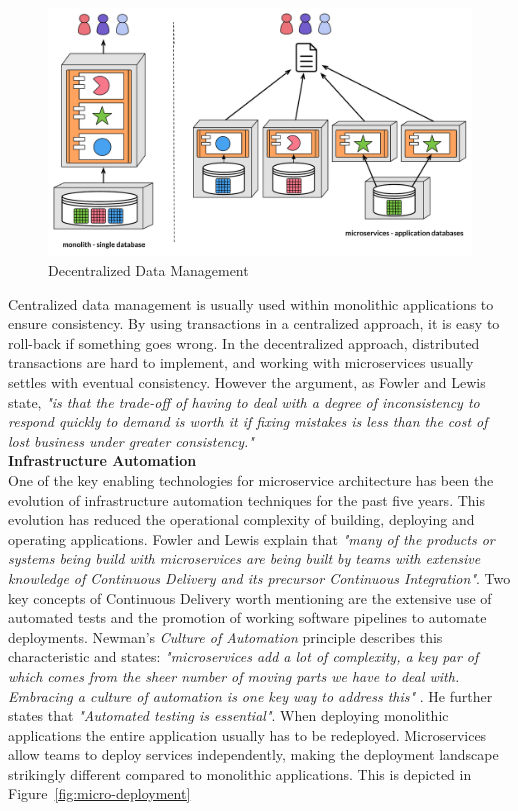 \begin{figure}[H]
    \centering
    \includegraphics[width=\textwidth]{figures/microservice_decentralised-data}
    \caption{Decentralized Data Management \cite[p. 10]{lewis2014microservices}}
    \label{fig:micro_decentralized_datamanagement}
\end{figure}

\noindent Centralized data management is usually used within monolithic applications to ensure consistency. By using transactions in a centralized approach, it is easy to roll-back if something goes wrong. In the decentralized approach, distributed transactions are hard to implement, and working with microservices usually settles with eventual consistency. However the argument, as Fowler and Lewis state, \textit{"is that the trade-off of having to deal with a degree of inconsistency to respond quickly to demand is worth it if fixing mistakes is less than the cost of lost business under greater consistency."} \cite[p. 10]{lewis2014microservices} \\


\noindent\textbf{Infrastructure Automation} \\
One of the key enabling technologies for microservice architecture has been the evolution of infrastructure automation techniques for the past five years. This evolution has reduced the operational complexity of building, deploying and operating applications. Fowler and Lewis explain that \textit{"many of the products or systems being build with microservices are being built by teams with extensive knowledge of Continuous Delivery and its precursor Continuous Integration"}\cite[p. 10]{lewis2014microservices}. Two key concepts of Continuous Delivery worth mentioning are the extensive use of automated tests and the promotion of working software pipelines to automate deployments. Newman's \textit{Culture of Automation} principle describes this characteristic and states: \textit{"microservices add a lot of complexity, a key par of which comes from the sheer number of moving parts we have to deal with. Embracing a culture of automation is one key way to address this"} \cite[p. 246]{newman2015building}. He further states that \textit{"Automated testing is essential"}. When deploying monolithic applications the entire application usually has to be redeployed. Microservices allow teams to deploy services independently, making the deployment landscape strikingly different compared to monolithic applications. This is depicted in Figure~\ref{fig:micro-deployment}

